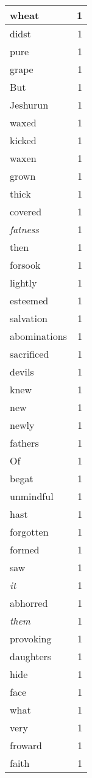 \begin{center}
\begin{longtable}{l|r}
wheat & 1 \\ \hline
didst & 1 \\ \hline
pure & 1 \\ \hline
grape & 1 \\ \hline
But & 1 \\ \hline
Jeshurun & 1 \\ \hline
waxed & 1 \\ \hline
kicked & 1 \\ \hline
waxen & 1 \\ \hline
grown & 1 \\ \hline
thick & 1 \\ \hline
covered & 1 \\ \hline
\emph{fatness} & 1 \\ \hline
then & 1 \\ \hline
forsook & 1 \\ \hline
lightly & 1 \\ \hline
esteemed & 1 \\ \hline
salvation & 1 \\ \hline
abominations & 1 \\ \hline
sacrificed & 1 \\ \hline
devils & 1 \\ \hline
knew & 1 \\ \hline
new & 1 \\ \hline
newly & 1 \\ \hline
fathers & 1 \\ \hline
Of & 1 \\ \hline
begat & 1 \\ \hline
unmindful & 1 \\ \hline
hast & 1 \\ \hline
forgotten & 1 \\ \hline
formed & 1 \\ \hline
saw & 1 \\ \hline
\emph{it} & 1 \\ \hline
abhorred & 1 \\ \hline
\emph{them} & 1 \\ \hline
provoking & 1 \\ \hline
daughters & 1 \\ \hline
hide & 1 \\ \hline
face & 1 \\ \hline
what & 1 \\ \hline
very & 1 \\ \hline
froward & 1 \\ \hline
faith & 1 \\ \hline

\end{longtable}
\end{center}
